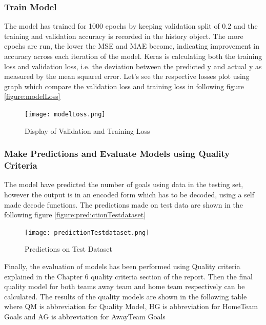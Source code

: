 \subsubsection{Train Model}
The model has trained for 1000 epochs by keeping validation split of 0.2 and the training and validation accuracy is recorded in the history object.
The more epochs are run, the lower the MSE and MAE become, indicating improvement in accuracy across each iteration of the model.\newline
Keras is calculating both the training loss and validation loss, i.e. the deviation between the predicted y and actual y as measured by the mean squared error. Let’s see the respective losses plot using graph which compare the validation loss and training loss in following figure \autoref{figure:modelLoss} \newline
\begin{figure}[H]
\begin{center}
\texttt{[image: modelLoss.png]}
\end{center}
\caption{Display of Validation and Training Loss }
\label{figure:modelLoss}
\end{figure}
\subsubsection{Make Predictions and Evaluate Models using Quality Criteria }
The model have predicted the number of goals using data in the testing set, however the output is in an encoded form which has to be decoded, using a self made decode functions. The predictions made on test data are shown in the following figure \autoref{figure:predictionTestdataset} \newline
\begin{figure}[H]
\begin{center}
\texttt{[image: predictionTestdataset.png]}
\end{center}
\caption{Predictions on Test Dataset }
\label{figure:predictionTestdataset}
\end{figure}
Finally, the evaluation of models has been performed using Quality criteria explained in the Chapter 6 quality criteria section of the report. Then the final quality model for both teams away team and home team respectively can be calculated. The results of the quality models are shown in the following table where QM is abbreviation for Quality Model, HG is abbreviation for HomeTeam Goals and AG is abbreviation for AwayTeam Goals\newline

